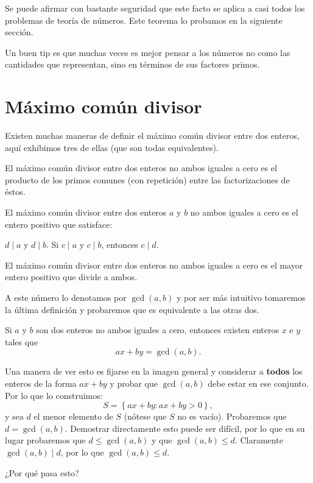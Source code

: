 Se puede afirmar con bastante seguridad que
este facto se aplica a casi todos los problemas
de teoría de números.
Este teorema lo probamos en la siguiente sección.

Un buen tip es que muchas veces es mejor
pensar a los números no como
las cantidades que representan, sino
en términos de sus factores primos.

\section{Máximo común divisor}
Existen muchas maneras de definir el
máximo común divisor entre dos
enteros, aquí exhibimos tres de ellas
(que son todas equivalentes).

\begin{definition}
	El máximo común divisor entre dos enteros
	no ambos iguales a cero
	es el producto de los primos comunes (con repetición)
	entre las factorizaciones de éstos.
\end{definition}

\begin{definition}
	El máximo común divisor
	entre dos enteros $a$ y $b$
	no ambos iguales a cero
	es el entero positivo que
	satisface:
	\begin{itemize}
		\ii $d \mid a$ y $d \mid b$.
		\ii Si $c \mid a$ y $c \mid b$, entonces $c \mid d$.
	\end{itemize}
\end{definition}

\begin{definition}
	El máximo común divisor entre dos enteros
	no ambos iguales a cero
	es el mayor entero positivo que
	divide a ambos.
\end{definition}

A este número lo denotamos por $\gcd (a, b)$
y por ser más intuitivo tomaremos
la última definición y probaremos
que es equivalente a las otras dos.

\begin{lemma}
	\label{lemma:bezout}
	Si $a$ y $b$ son dos enteros no ambos iguales a cero,
	entonces existen enteros $x$ e $y$ tales que
	\[ax + by = \gcd (a, b).\]
\end{lemma}

Una manera de ver esto es fijarse en la
imagen general y considerar a \textbf{todos}
los enteros de la forma $ax + by$
y probar que $\gcd (a, b)$ debe estar
en ese conjunto. Por lo que lo construimos:
\[S = \left\{ax + by \colon ax + by > 0\right\},\]
y sea $d$ el menor elemento de $S$ (nótese que
$S$ no es vacío). Probaremos que $d = \gcd (a, b)$.
Demostrar directamente esto puede ser difícil,
por lo que en su lugar probaremos que $d \leq \gcd(a, b)$
y que $\gcd (a, b) \leq d$.
Claramente $\gcd (a, b) \mid d$,
por lo que $\gcd (a, b) \leq d$.
\begin{question*}
	¿Por qué pasa esto?
\end{question*}

